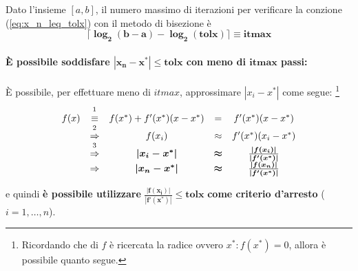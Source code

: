 \addtocounter{footnote}{-1}


\begin{definition}\label{def:itmax_metodo_bisezione}
	Dato l'insieme $[a,b]$, il numero massimo di iterazioni per verificare la conzione (\ref{eq:x_n_leq_tolx}) con il metodo di bisezione è
	\begin{equation*}
		\boldsymbol{\lceil \log_{2}(b-a)-\log_{2}(tolx)\rceil \equiv itmax}
	\end{equation*}
\end{definition}

\paragraph{È possibile soddisfare $\boldsymbol{|x_n-x^*|\leq tolx}$ con meno di $\boldsymbol{itmax}$ passi:}
È possibile, per effettuare meno di $itmax$, approssimare $|x_i-x^*|$ come segue:
\footnote{Ricordando che di $f$ è ricercata la radice ovvero $x^*:f(x^*)=0$, allora è possibile quanto segue.}
\begin{equation*}
	\begin{matrix}
		f(x)&\overset{\footnotemark}{\equiv}& f(x^*)+f'(x^*)(x-x^*)&=&f'(x^*)(x-x^*)\\
		&\overset{\footnotemark}{\Rightarrow}&f(x_i)&\approx& f'(x^*)(x_i-x^*)\\
		&\overset{\footnotemark}{\Rightarrow}&\boldsymbol{|x_i-x^*|}&\boldsymbol\approx&\boldsymbol{\frac{|f(x_i)|}{|f'(x^*)|}}\\
		&\Rightarrow&\boldsymbol{|x_n-x^*|}&\boldsymbol\approx&\boldsymbol{\frac{|f(x_n)|}{|f'(x^*)|}}
	\end{matrix}
\end{equation*}

\addtocounter{footnote}{-2}



\noindent e quindi \textbf{è possibile utilizzare} $\boldsymbol{\frac{|f(x_i)|}{|f'(x^*)|}\leq tolx}$ \textbf{come criterio d'arresto} ($i=1,\hdots, n$). 

